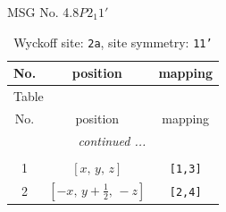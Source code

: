 \documentclass[fleqn,8pt]{jsarticle}
\begin{document}
\setcounter{MaxMatrixCols}{32}

\renewcommand{\tablename}{Table~}
\renewcommand{\figurename}{Figure~}
\begin{center}
\LARGE
MSG No. 4.8\quad$P2_{1}1'$
\end{center}
\renewcommand{\arraystretch}{1.2}
\begin{longtable}{ccc}
\caption{Wyckoff site: {\tt 2a}, site symmetry: {\tt 11'}}
 \\
 \hline \hline
No. & position & mapping \\ \hline \endfirsthead

\multicolumn{2}{l}{\tablename\ \thetable{}} \\
 \hline \hline
No. & position & mapping \\ \hline \endhead

 \hline \hline
\multicolumn{2}{r}{\footnotesize\it continued ...} \\ \endfoot

 \hline \hline
\multicolumn{2}{r}{} \\ \endlastfoot

1 & $\left[ x,\, y,\, z \right]$ & {\tt [1,3]} \\ \hline
2 & $\left[ - x,\, y + \frac{1}{2},\, - z \right]$ & {\tt [2,4]} \\
\end{longtable}
\end{document}
